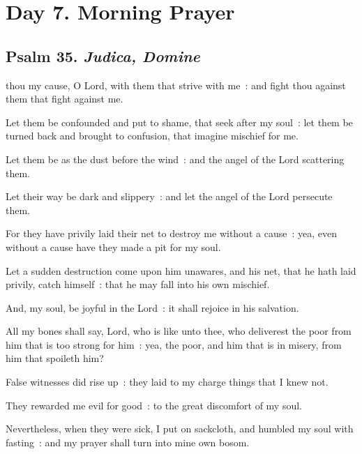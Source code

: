 \section*{Day 7. Morning Prayer}

\subsection{Psalm 35. \textit{Judica, Domine}}

 thou my cause, O Lord, with them that strive with me~: and fight thou against them that fight against me.\par
{}
Let them be confounded and put to shame, that seek after my soul~: let them be turned back and brought to confusion, that imagine mischief for me.\par
{}Let them be as the dust before the wind~: and the angel of the Lord scattering them.\par
{}Let their way be dark and slippery~: and let the angel of the Lord persecute them.\par
{}For they have privily laid their net to destroy me without a cause~: yea, even without a cause have they made a pit for my soul.\par
{}Let a sudden destruction come upon him unawares, and his net, that he hath laid privily, catch himself~: that he may fall into his own mischief.\par
{}And, my soul, be joyful in the Lord~: it shall rejoice in his salvation.\par
{}All my bones shall say, Lord, who is like unto thee, who deliverest the poor from him that is too strong for him~: yea, the poor, and him that is in misery, from him that spoileth him?\par
{}False witnesses did rise up~: they laid to my charge things that I knew not.\par
{}They rewarded me evil for good~: to the great discomfort of my soul.\par
{}Nevertheless, when they were sick, I put on sackcloth, and humbled my soul with fasting~: and my prayer shall turn into mine own bosom.\par
